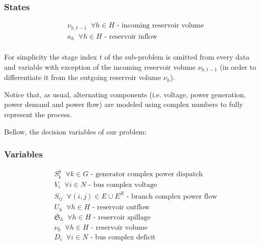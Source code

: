 \documentclass{juliacon}
\begin{document}
\subsubsection*{States}
\begin{align*}
%
& \nu_{h,t-1}  \;\; \forall h \in H \nonumber \mbox{ - incoming reservoir volume}\\
& a_{h}  \;\; \forall h \in H \nonumber \mbox{ - reservoir inflow}\\
%
\end{align*}

For simplicity the stage index $t$ of the sub-problem is omitted from every data and variable with exception of the incoming reservoir volume $\nu_{h,t-1}$ (in order to differentiate it from the outgoing reservoir volume $\nu_{h}$).

Notice that, as usual, alternating components (i.e. voltage, power generation, power demand and power flow) are modeled using complex numbers to fully represent the process.

Bellow, the decision variables of our problem:

\subsubsection*{Variables}
\begin{align*}
%
& S^g_k \;\; \forall k\in G \mbox{ - generator complex power dispatch} \\
& V_i \;\; \forall i\in N \mbox{ - bus complex voltage}\\
& S_{ij} \;\; \forall (i,j) \in E \cup E^R \mbox{ - branch complex power flow}\\
& U_h \;\; \forall h \in H \mbox{ - reservoir outflow}\\
& \mathfrak{S}_h \;\; \forall h \in H \mbox{ - reservoir spillage}\\
& \nu_h \;\; \forall h \in H \mbox{ - reservoir volume}\\
& D_i \;\; \forall i\in N \mbox{ - bus complex deficit}\\
%
\end{align*}
\end{document}
